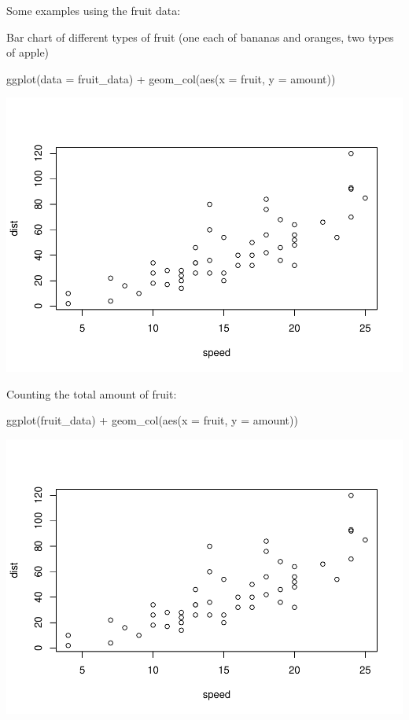 \documentclass[
]{book}
\newenvironment{Shaded}{\begin{snugshade}}{\end{snugshade}}
\newcommand{\AttributeTok}[1]{\textcolor[rgb]{0.77,0.63,0.00}{#1}}
\newcommand{\FunctionTok}[1]{\textcolor[rgb]{0.00,0.00,0.00}{#1}}
\newcommand{\NormalTok}[1]{#1}
\newcommand{\SpecialCharTok}[1]{\textcolor[rgb]{0.00,0.00,0.00}{#1}}
\begin{document}
Some examples using the fruit data:

Bar chart of different types of fruit (one each of bananas and oranges, two types of apple)

\begin{Shaded}
\begin{Highlighting}[]
\FunctionTok{ggplot}\NormalTok{(}\AttributeTok{data =}\NormalTok{ fruit\_data) }\SpecialCharTok{+} \FunctionTok{geom\_col}\NormalTok{(}\FunctionTok{aes}\NormalTok{(}\AttributeTok{x =}\NormalTok{ fruit, }\AttributeTok{y =}\NormalTok{ amount))}
\end{Highlighting}
\end{Shaded}

\includegraphics{_main_files/figure-latex/unnamed-chunk-28-1.pdf}

Counting the total amount of fruit:

\begin{Shaded}
\begin{Highlighting}[]
\FunctionTok{ggplot}\NormalTok{(fruit\_data) }\SpecialCharTok{+} \FunctionTok{geom\_col}\NormalTok{(}\FunctionTok{aes}\NormalTok{(}\AttributeTok{x =}\NormalTok{ fruit, }\AttributeTok{y =}\NormalTok{ amount))}
\end{Highlighting}
\end{Shaded}

\includegraphics{_main_files/figure-latex/unnamed-chunk-29-1.pdf}
\end{document}
